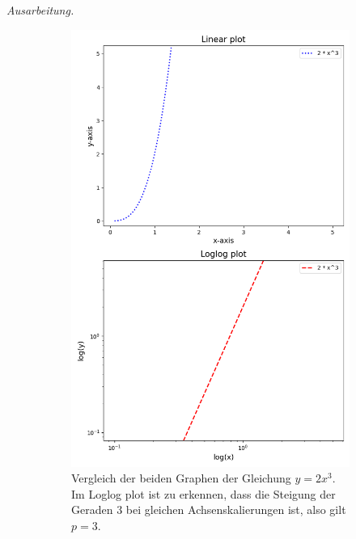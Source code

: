 \documentclass[]{article}
\newenvironment{ausarbeitung}{\vspace{3mm}\noindent\textit{Ausarbeitung.}}{}
\begin{document}
\begin{ausarbeitung}
	\begin{figure}
		\centering
		\begin{subfigure}{0.48\textwidth}
			\includegraphics[width=\textwidth]{loglog_plot_a}
			\caption{Vergleich der beiden Graphen der Gleichung $y = 2x^3$. Im Loglog plot ist zu erkennen, dass die Steigung der Geraden $3$ bei gleichen Achsenskalierungen ist, also gilt $p = 3$.}
			\label{fig:loglog_plot_a}
		\end{subfigure}
		\hfill
		\begin{subfigure}{0.48\textwidth}

\end{subfigure}
\end{figure}
\end{ausarbeitung}
\end{document}
